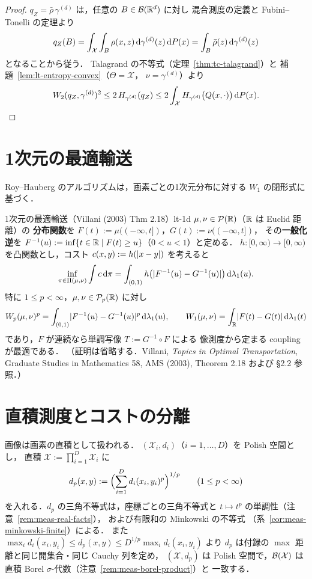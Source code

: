 \begin{proof}
  $q_Z=\bar\rho\,\gamma^{(d)}$ は，任意の $B\in\mathcal{B}(\mathbb{R}^d)$ に対し
  混合測度の定義と Fubini--Tonelli の定理より
  \[
    q_Z(B)=\int_{\mathcal{X}}\int_B\rho(x,z)\,\mathrm{d}\gamma^{(d)}(z)\,\mathrm{d} P(x)
    =\int_B\bar\rho(z)\,\mathrm{d}\gamma^{(d)}(z)
  \]
  となることから従う．
  Talagrand の不等式（定理~\ref{thm:tc-talagrand}）と
  補題~\ref{lem:lt-entropy-convex}（$\Theta=\mathcal{X}$，
  $\nu=\gamma^{(d)}$）より
  \[
    W_2(q_Z,\gamma^{(d)})^2
    \leq2\,H_{\gamma^{(d)}}(q_Z)
    \leq2\int_{\mathcal{X}}H_{\gamma^{(d)}}\bigl(Q(x,\cdot)\bigr)\,\mathrm{d} P(x).
    \qedhere
  \]
\end{proof}

\section{1次元の最適輸送}
\label{sec:lt-1d}

Roy--Hauberg のアルゴリズムは，画素ごとの1次元分布に対する
$W_1$ の閉形式に基づく．

\begin{theorem}{1次元の最適輸送（Villani (2003) Thm 2.18）}{lt-1d}
  $\mu,\nu\in\mathcal{P}(\mathbb{R})$（$\mathbb{R}$ は Euclid 距離）の
  \textbf{分布関数}を
  $F(t):=\mu((-\infty,t])$，$G(t):=\nu((-\infty,t])$，
  その\textbf{一般化逆}を
  $F^{-1}(u):=\inf\{t\in\mathbb{R}\mid F(t)\geq u\}$（$0<u<1$）と定める．
  $h\colon[0,\infty)\to[0,\infty)$ を凸関数とし，コスト
  $c(x,y):=h(\lvert x-y \rvert)$ を考えると
  \[
    \inf_{\pi\in\Pi(\mu,\nu)}\int c\,\mathrm{d}\pi
    =\int_{(0,1)}h\bigl(\lvert F^{-1}(u)-G^{-1}(u) \rvert\bigr)\,\mathrm{d}\lambda_1(u).
  \]
  特に $1\leq p<\infty$，$\mu,\nu\in\mathcal{P}_{p}(\mathbb{R})$ に対し
  \[
    W_p(\mu,\nu)^p
    =\int_{(0,1)}\lvert F^{-1}(u)-G^{-1}(u) \rvert^p\,\mathrm{d}\lambda_1(u),
    \qquad
    W_1(\mu,\nu)=\int_{\mathbb{R}}\lvert F(t)-G(t) \rvert\,\mathrm{d}\lambda_1(t)
  \]
  であり，$F$ が連続なら単調写像 $T:=G^{-1}\circ F$ による
  像測度から定まる coupling が最適である．
  （証明は省略する．Villani,
  \emph{Topics in Optimal Transportation},
  Graduate Studies in Mathematics 58, AMS (2003),
  Theorem 2.18 および §2.2 参照．）
\end{theorem}

\section{直積測度とコストの分離}
\label{sec:lt-product}

画像は画素の直積として扱われる．
$(\mathcal{X}_i,d_i)$（$i=1,\dots,D$）を Polish 空間とし，
直積 $\mathcal{X}:=\prod_{i=1}^D\mathcal{X}_i$ に
\[
  d_p(x,y):=\Bigl(\sum_{i=1}^Dd_i(x_i,y_i)^p\Bigr)^{1/p}
  \qquad(1\leq p<\infty)
\]
を入れる．$d_p$ の三角不等式は，座標ごとの三角不等式と
$t\mapsto t^p$ の単調性（注意~\ref{rem:meas-real-facts}），
および有限和の Minkowski の不等式
（系~\ref{cor:meas-minkowski-finite}）による．
また
$\max_id_i(x_i,y_i)\leq d_p(x,y)\leq D^{1/p}\max_id_i(x_i,y_i)$
より $d_p$ は付録の $\max$ 距離と同じ開集合・同じ Cauchy 列を定め，
$(\mathcal{X},d_p)$ は Polish 空間で，$\mathcal{B}(\mathcal{X})$ は
直積 Borel $\sigma$-代数（注意~\ref{rem:meas-borel-product}）と
一致する．

